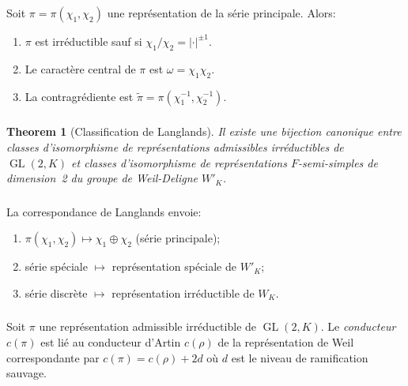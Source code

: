 \documentclass[11pt,a4paper]{amsart}
\theoremstyle{plain}
\newtheorem{theorem}{Theorem}[section]
\theoremstyle{definition}
\theoremstyle{remark}
\DeclareMathOperator{\GL}{GL}
\begin{document}
\subsubsection{}
\label{sec:3.2.2}

Soit $\pi = \pi(\chi_1, \chi_2)$ une repr\'esentation de la s\'erie principale. Alors:
\begin{enumerate}
\item[(i)] $\pi$ est irr\'eductible sauf si $\chi_1/\chi_2 = |\cdot|^{\pm 1}$.
\item[(ii)] Le caract\`ere central de $\pi$ est $\omega = \chi_1 \chi_2$.
\item[(iii)] La contragr\'ediente est $\widetilde{\pi} = \pi(\chi_1^{-1}, \chi_2^{-1})$.
\end{enumerate}

\subsubsection{}
\label{sec:3.2.3}

\begin{theorem}[Classification de Langlands] \label{thm:langlands}
Il existe une bijection canonique entre classes d'isomorphisme de repr\'esentations admissibles irr\'eductibles de $\GL(2,K)$ et classes d'isomorphisme de repr\'esentations $F$-semi-simples de dimension~2 du groupe de Weil-Deligne $W'_K$.
\end{theorem}

\subsubsection{}
\label{sec:3.2.4}

La correspondance de Langlands envoie:
\begin{enumerate}
\item[(i)] $\pi(\chi_1, \chi_2) \mapsto \chi_1 \oplus \chi_2$ (s\'erie principale);
\item[(ii)] s\'erie sp\'eciale $\mapsto$ repr\'esentation sp\'eciale de $W'_K$;
\item[(iii)] s\'erie discr\`ete $\mapsto$ repr\'esentation irr\'eductible de $W_K$.
\end{enumerate}

\subsubsection{}
\label{sec:3.2.5}

Soit $\pi$ une repr\'esentation admissible irr\'eductible de $\GL(2,K)$. Le \emph{conducteur} $c(\pi)$ est li\'e au conducteur d'Artin $c(\rho)$ de la repr\'esentation de Weil correspondante par $c(\pi) = c(\rho) + 2d$ o\`u $d$ est le niveau de ramification sauvage.
\end{document}

